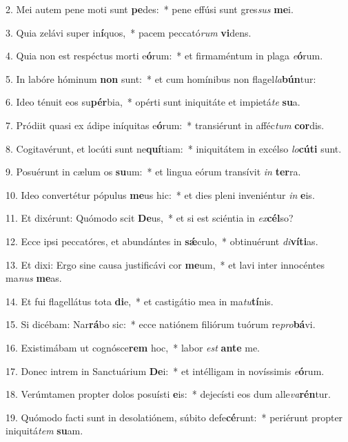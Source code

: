 2. Mei autem pene moti sunt \textbf{pe}des:~*  pene effúsi sunt gres\textit{sus} \textbf{me}i.\

3. Quia zelávi super in\textbf{í}quos,~*  pacem peccató\textit{rum} \textbf{vi}dens.\

4. Quia non est respéctus morti e\textbf{ó}rum:~*  et firmaméntum in plaga \textit{e}\textbf{ó}rum.\

5. In labóre hóminum \textbf{non} sunt:~*  et cum homínibus non flagel\textit{la}\textbf{bún}tur:\

6. Ideo ténuit eos su\textbf{pér}bia,~*  opérti sunt iniquitáte et impietá\textit{te} \textbf{su}a.\

7. Pródiit quasi ex ádipe iníquitas e\textbf{ó}rum:~*  transiérunt in afféc\textit{tum} \textbf{cor}dis.\

8. Cogitavérunt, et locúti sunt ne\textbf{quí}tiam:~*  iniquitátem in excélso \textit{lo}\textbf{cú}\textbf{ti} sunt.\

9. Posuérunt in cælum os \textbf{su}um:~*  et lingua eórum transívit \textit{in} \textbf{ter}ra.\

10. Ideo convertétur pópulus \textbf{me}us hic:~*  et dies pleni inveniéntur \textit{in} \textbf{e}is.\

11. Et dixérunt: Quómodo scit \textbf{De}us,~*  et si est sciéntia in \textit{ex}\textbf{cél}so?\

12. Ecce ipsi peccatóres, et abundántes in \textbf{sǽ}culo,~*  obtinuérunt \textit{di}\textbf{ví}\textbf{ti}as.\

13. Et dixi: Ergo sine causa justificávi cor \textbf{me}um,~*  et lavi inter innocéntes ma\textit{nus} \textbf{me}as.\

14. Et fui flagellátus tota \textbf{di}e,~*  et castigátio mea in ma\textit{tu}\textbf{tí}nis.\

15. Si dicébam: Nar\textbf{rá}bo sic:~*  ecce natiónem filiórum tuórum re\textit{pro}\textbf{bá}vi.\

16. Existimábam ut cognósce\textbf{rem} hoc,~*  labor \textit{est} \textbf{an}\textbf{te} me.\

17. Donec intrem in Sanctuárium \textbf{De}i:~*  et intélligam in novíssimis \textit{e}\textbf{ó}rum.\

18. Verúmtamen propter dolos posuísti \textbf{e}is:~*  dejecísti eos dum alle\textit{va}\textbf{rén}tur.\

19. Quómodo facti sunt in desolatiónem, súbito defe\textbf{cé}runt:~*  periérunt propter iniquitá\textit{tem} \textbf{su}am.\


